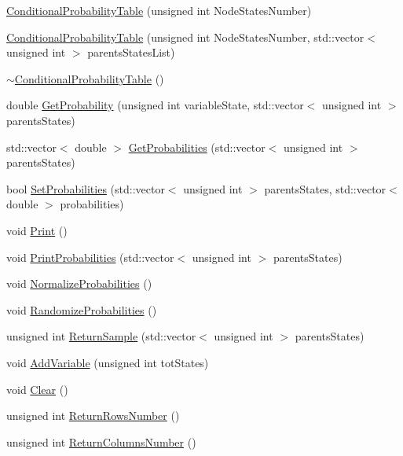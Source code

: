 \begin{DoxyCompactItemize}
\item 
\hyperlink{classbayonet_1_1_conditional_probability_table_a58abcca6946f80bfe3c86ccbbdeed31e}{Conditional\-Probability\-Table} (unsigned int Node\-States\-Number)
\item 
\hyperlink{classbayonet_1_1_conditional_probability_table_af83db269bcfc340658801d5e473ad5c8}{Conditional\-Probability\-Table} (unsigned int Node\-States\-Number, std\-::vector$<$ unsigned int $>$ parents\-States\-List)
\item 
\hyperlink{classbayonet_1_1_conditional_probability_table_a5fd07eba1d571bf8f8bac3014f2409b2}{$\sim$\-Conditional\-Probability\-Table} ()
\item 
double \hyperlink{classbayonet_1_1_conditional_probability_table_aeb4965bc9b4903d5108fd9b6e1379e1b}{Get\-Probability} (unsigned int variable\-State, std\-::vector$<$ unsigned int $>$ parents\-States)
\item 
std\-::vector$<$ double $>$ \hyperlink{classbayonet_1_1_conditional_probability_table_a7612e2c40e51eaf4d94109adb2bd269d}{Get\-Probabilities} (std\-::vector$<$ unsigned int $>$ parents\-States)
\item 
bool \hyperlink{classbayonet_1_1_conditional_probability_table_ac94cd225747e8f59c5497b860ff777c0}{Set\-Probabilities} (std\-::vector$<$ unsigned int $>$ parents\-States, std\-::vector$<$ double $>$ probabilities)
\item 
void \hyperlink{classbayonet_1_1_conditional_probability_table_a0815f7814cc5797629035f17f0cf26c2}{Print} ()
\item 
void \hyperlink{classbayonet_1_1_conditional_probability_table_a0ca5c1cbfeb5c86ef06161a810233b2a}{Print\-Probabilities} (std\-::vector$<$ unsigned int $>$ parents\-States)
\item 
void \hyperlink{classbayonet_1_1_conditional_probability_table_a600256d28edeef688ab4cdf38794acc3}{Normalize\-Probabilities} ()
\item 
void \hyperlink{classbayonet_1_1_conditional_probability_table_a224d882019f784a993c50043dca4cb5d}{Randomize\-Probabilities} ()
\item 
unsigned int \hyperlink{classbayonet_1_1_conditional_probability_table_a3e600c4b5247dd52a5d0e775ca898c69}{Return\-Sample} (std\-::vector$<$ unsigned int $>$ parents\-States)
\item 
void \hyperlink{classbayonet_1_1_conditional_probability_table_a038e1940c40528ac23101272f33f752c}{Add\-Variable} (unsigned int tot\-States)
\item 
void \hyperlink{classbayonet_1_1_conditional_probability_table_a1708d2e94833fe8e0c37e661269dc11d}{Clear} ()
\item 
unsigned int \hyperlink{classbayonet_1_1_conditional_probability_table_ae2b35a361fb92684abdfde96887b24e6}{Return\-Rows\-Number} ()
\item 
unsigned int \hyperlink{classbayonet_1_1_conditional_probability_table_a2fef41dbe55cbccc82b3921d4d471c1d}{Return\-Columns\-Number} ()
\end{DoxyCompactItemize}


